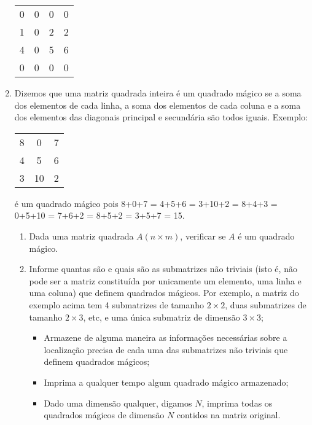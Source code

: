 \begin{enumerate}
\begin{center}
\begin{tabular}{cccc}
0 & 0 & 0 & 0 \\
1 & 0 & 2 & 2 \\
4 & 0 & 5 & 6 \\
0 & 0 & 0 & 0 \\
\end{tabular}
\end{center}



\item  Dizemos  que uma matriz  quadrada inteira é  um quadrado mágico  se a
soma dos elementos de cada linha,  a soma dos elementos de cada coluna e
a  soma dos  elementos das  diagonais principal  e secundária  são todos
iguais.  Exemplo:

\begin{center}
\begin{tabular}{ccc}
8 &  0 & 7 \\
4 &  5 & 6 \\
3 & 10 & 2 \\
\end{tabular}
\end{center}

é um quadrado mágico pois 
8+0+7 = 4+5+6 = 3+10+2 = 8+4+3 = 0+5+10 = 7+6+2 = 8+5+2 = 3+5+7 = 15.

\begin{enumerate}
\item Dada  uma matriz  quadrada  $A (n \times m)$,  
verificar  se $A$  é um  quadrado mágico. 
\item Informe quantas são e quais são as submatrizes não triviais
      (isto é, não pode ser a matriz constituída por unicamente um elemento, 
      uma linha e uma coluna) que definem quadrados mágicos. 
      Por exemplo, a matriz do exemplo acima
      tem 4 submatrizes de tamanho $2 \times 2$, duas submatrizes de 
      tamanho $2 \times 3$, etc, e uma única submatriz de dimensão
      $3 \times 3$;
\begin{itemize}
\item Armazene de alguma maneira as 
      informações necessárias sobre a localização precisa de cada uma das 
      submatrizes não triviais que definem quadrados mágicos;
\item Imprima a qualquer tempo algum quadrado mágico armazenado;
\item Dado uma dimensão qualquer, digamos $N$, imprima todas os 
      quadrados mágicos de dimensão $N$ contidos na matriz original.
\end{itemize}
\end{enumerate}



\end{enumerate}
